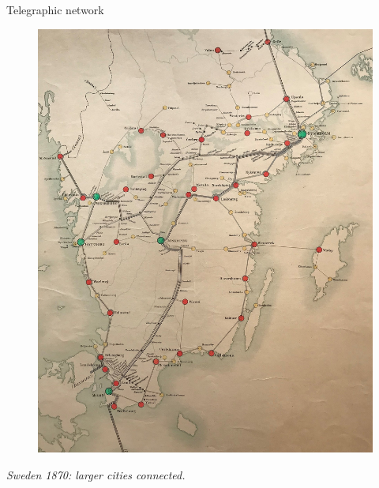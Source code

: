 \begin{frame}{Telegraphic network}
  \begin{figure}
    \center
    \includegraphics[scale=0.08]{sweden.jpg}

  \end{figure}

  \vspace{10pt}\pause  
  {\em Sweden 1870: larger cities connected.}
  
\end{frame}


